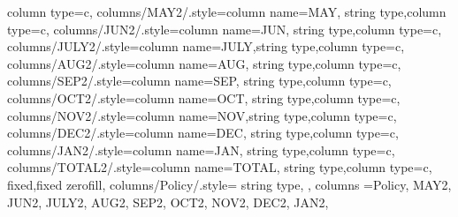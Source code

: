 \begin{table*}[tbh]
    column type=c,
    columns/MAY2/.style={column name={MAY}, string type,column type=c}, 
    columns/JUN2/.style={column name={JUN}, string type,column type=c}, 
    columns/JULY2/.style={column name={JULY},string type,column type=c}, 
    columns/AUG2/.style={column name={AUG}, string type,column type=c}, 
    columns/SEP2/.style={column name={SEP}, string type,column type=c}, 
    columns/OCT2/.style={column name={OCT}, string type,column type=c}, 
    columns/NOV2/.style={column name={NOV},string type,column type=c}, 
    columns/DEC2/.style={column name={DEC}, string type,column type=c}, 
    columns/JAN2/.style={column name={JAN}, string type,column type=c},
    columns/TOTAL2/.style={column name={TOTAL}, string type,column type=c},
    fixed,fixed zerofill,     %
    columns/Policy/.style={
        string type,
      },
    columns ={Policy, MAY2, JUN2, JULY2, AUG2, SEP2, OCT2, NOV2, DEC2, JAN2},

\end{table*}
